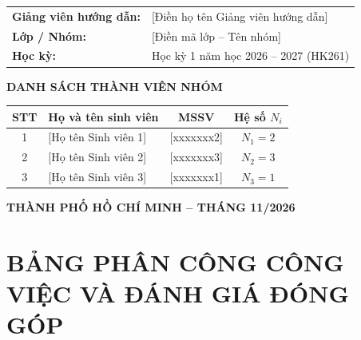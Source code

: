 \begin{titlepage}
\begin{center}
        \vspace{0.8cm}

        {\renewcommand{\arraystretch}{1.35}
        \begin{tabular}{>{\bfseries}l l}
            Giảng viên hướng dẫn: & {\color{accentred}[Điền họ tên Giảng viên hướng dẫn]} \\
            Lớp / Nhóm:           & {\color{accentred}[Điền mã lớp -- Tên nhóm]} \\
            Học kỳ:               & Học kỳ 1 năm học 2026 -- 2027 (HK261) \\
        \end{tabular}}

        \vspace{0.65cm}
        {\bfseries\color{hcmutblue} DANH SÁCH THÀNH VIÊN NHÓM}\\[6pt]
        {\renewcommand{\arraystretch}{1.3}
        \begin{tabular}{|c|l|c|c|}
            \hline
            \textbf{STT} & \textbf{Họ và tên sinh viên} & \textbf{MSSV} & \textbf{Hệ số $N_i$} \\
            \hline
            1 & {\color{accentred}[Họ tên Sinh viên 1]} & {\color{accentred}[xxxxxxx2]} & $N_1 = 2$ \\
            \hline
            2 & {\color{accentred}[Họ tên Sinh viên 2]} & {\color{accentred}[xxxxxxx3]} & $N_2 = 3$ \\
            \hline
            3 & {\color{accentred}[Họ tên Sinh viên 3]} & {\color{accentred}[xxxxxxx1]} & $N_3 = 1$ \\
            \hline
        \end{tabular}}

        \vfill
        {\fontsize{12}{15}\selectfont \textbf{THÀNH PHỐ HỒ CHÍ MINH -- THÁNG 11/2026}}
        \vspace*{0.1cm}
    \end{center}
\end{titlepage}

\clearpage
\pagestyle{hcmut}
\setcounter{page}{1}

\section*{BẢNG PHÂN CÔNG CÔNG VIỆC VÀ ĐÁNH GIÁ ĐÓNG GÓP}

